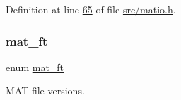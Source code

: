 Definition at line \hyperlink{src_2matio_8h_source_l00065}{65} of file \hyperlink{src_2matio_8h_source}{src/matio.\+h}.

\mbox{\label{group___m_a_t_gad03442b8378999189d510e3745c702b7}} 
\subsubsection{\texorpdfstring{mat\+\_\+ft}{mat\_ft}\hspace{0.1cm}{\footnotesize\ttfamily [2/2]}}
{\footnotesize\ttfamily enum \hyperlink{group___m_a_t_gad03442b8378999189d510e3745c702b7}{mat\+\_\+ft}}



M\+AT file versions. 

